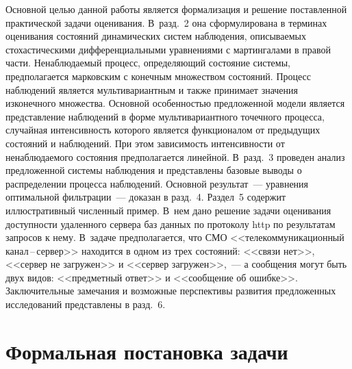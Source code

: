 \begin{multicols}{2}
Основной целью данной работы является формализация и решение поставленной
практической задачи оценивания. В~разд.~2 она сформулирована в терминах
оценивания состояний динамических систем наблюдения, описываемых стохастическими
дифференциальными уравнениями с мартингалами в правой части. Ненаблюдаемый процесс,
определяющий состояние системы, предполагается марковским с конечным множеством\linebreak
со\-сто\-яний. Процесс наблюдений является мультивариантным и также принимает
значения из\linebreak конечного множества. Основной особенностью предложенной модели
является представление наблюдений в форме мультивариантного точечного процесса,
случайная интенсивность которого является функционалом от предыдущих состояний и\linebreak
наблюдений. При этом зависимость интенсив\-ности от не\-наблю\-да\-емо\-го со\-сто\-яния
предполагается линейной. В~разд.~3 проведен анализ пред\-ложенной сис\-те\-мы
наблюдения и представлены \mbox{базовые} выводы о распределении процесса наблюдений.
Основной результат~--- уравнения оптимальной фильтрации~--- доказан в разд.~4.
Раздел~5 содержит иллюстративный численный пример. В~нем дано решение задачи
оценивания доступности удаленного сервера баз данных по протоколу {\sf http}
по результатам запросов к нему. В~задаче предполагается, что СМО
<<телекоммуникационный ка\-нал\,--\,сер\-вер>> находится в одном из трех состояний:
 <<связи нет>>, <<сервер не загружен>> и <<сервер загружен>>,~---
 а сообщения могут быть двух видов: <<предметный ответ>> и <<сообщение об ошибке>>.
 Заключительные замечания и возможные перспективы развития предложенных исследований
 представлены в разд.~6.

 \section{Формальная постановка задачи}


\end{multicols}
